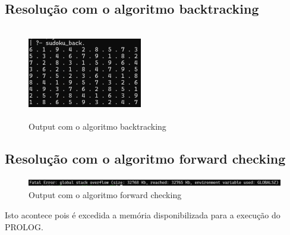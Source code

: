 \documentclass{article}
\begin{document}
\subsection{Resolução com o algoritmo backtracking}

\begin{figure}[ht]
    \centering
    \includegraphics[width=5cm, height=4cm]{image.png}
    \caption{Output com o algoritmo backtracking}
    \label{fig:Resolução do sudoku com o algoritmo backtracking}
\end{figure}

\subsection{Resolução com o algoritmo forward checking}

\begin{figure}[ht]
    \centering
    \includegraphics[width=15cm, height=0.37cm]{image2.png}
    \caption{Output com o algoritmo forward checking}
    \label{fig:Resolução do sudoku com o algoritmo forwward checking}
\end{figure}

Isto acontece pois é excedida a memória disponibilizada para a execução do PROLOG.
\end{document}
